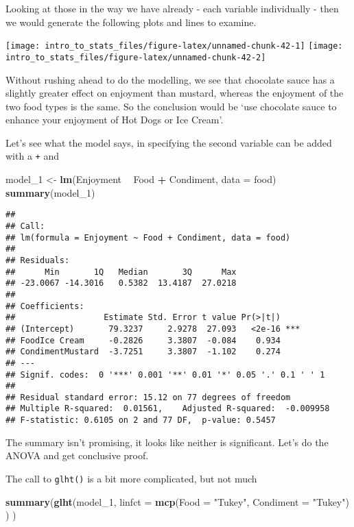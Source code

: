 \documentclass[]{book}
\newenvironment{Shaded}{\begin{snugshade}}{\end{snugshade}}
\newcommand{\DataTypeTok}[1]{\textcolor[rgb]{0.13,0.29,0.53}{#1}}
\newcommand{\DecValTok}[1]{\textcolor[rgb]{0.00,0.00,0.81}{#1}}
\newcommand{\KeywordTok}[1]{\textcolor[rgb]{0.13,0.29,0.53}{\textbf{#1}}}
\newcommand{\NormalTok}[1]{#1}
\newcommand{\OperatorTok}[1]{\textcolor[rgb]{0.81,0.36,0.00}{\textbf{#1}}}
\newcommand{\StringTok}[1]{\textcolor[rgb]{0.31,0.60,0.02}{#1}}
\begin{document}
Looking at those in the way we have already - each variable individually - then we would generate the following plots and lines to examine.

\texttt{[image: intro\_to\_stats\_files/figure-latex/unnamed-chunk-42-1]} \texttt{[image: intro\_to\_stats\_files/figure-latex/unnamed-chunk-42-2]}

Without rushing ahead to do the modelling, we see that chocolate sauce has a slightly greater effect on enjoyment than mustard, whereas the enjoyment of the two food types is the same. So the conclusion would be `use chocolate sauce to enhance your enjoyment of Hot Dogs or Ice Cream'.

Let's see what the model says, in specifying the second variable can be added with a \texttt{+} and

\begin{Shaded}
\begin{Highlighting}[]
\NormalTok{model_}\DecValTok{1}\NormalTok{ <-}\StringTok{ }\KeywordTok{lm}\NormalTok{(Enjoyment }\OperatorTok{~}\StringTok{ }\NormalTok{Food }\OperatorTok{+}\StringTok{ }\NormalTok{Condiment, }\DataTypeTok{data =}\NormalTok{ food)}
\KeywordTok{summary}\NormalTok{(model_}\DecValTok{1}\NormalTok{)}
\end{Highlighting}
\end{Shaded}

\begin{verbatim}
## 
## Call:
## lm(formula = Enjoyment ~ Food + Condiment, data = food)
## 
## Residuals:
##      Min       1Q   Median       3Q      Max 
## -23.0067 -14.3016   0.5382  13.4187  27.0218 
## 
## Coefficients:
##                  Estimate Std. Error t value Pr(>|t|)    
## (Intercept)       79.3237     2.9278  27.093   <2e-16 ***
## FoodIce Cream     -0.2826     3.3807  -0.084    0.934    
## CondimentMustard  -3.7251     3.3807  -1.102    0.274    
## ---
## Signif. codes:  0 '***' 0.001 '**' 0.01 '*' 0.05 '.' 0.1 ' ' 1
## 
## Residual standard error: 15.12 on 77 degrees of freedom
## Multiple R-squared:  0.01561,    Adjusted R-squared:  -0.009958 
## F-statistic: 0.6105 on 2 and 77 DF,  p-value: 0.5457
\end{verbatim}

The summary isn't promising, it looks like neither is significant. Let's do the ANOVA and get conclusive proof.

The call to \texttt{glht()} is a bit more complicated, but not much

\begin{Shaded}
\begin{Highlighting}[]
\KeywordTok{summary}\NormalTok{(}\KeywordTok{glht}\NormalTok{(model_}\DecValTok{1}\NormalTok{, }\DataTypeTok{linfct =} \KeywordTok{mcp}\NormalTok{(}\DataTypeTok{Food =} \StringTok{"Tukey"}\NormalTok{, }\DataTypeTok{Condiment =} \StringTok{"Tukey"}\NormalTok{) ) )}
\end{Highlighting}
\end{Shaded}
\end{document}
